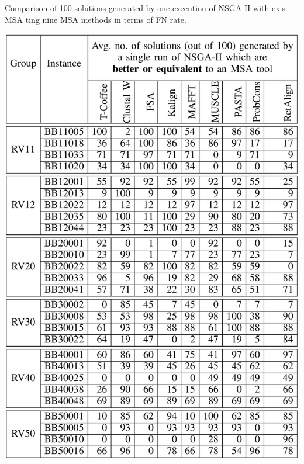 \begin{table}[!h]
\centering
	\caption{Comparison of 100 solutions generated by one execution of NSGA-II with exis MSA ting nine MSA methods in terms of FN rate.} \includegraphics[width=0.8\columnwidth]{Figure/comparison_gap_sop}
	\label{tab:balibase_good_solutions}
\end{table}




